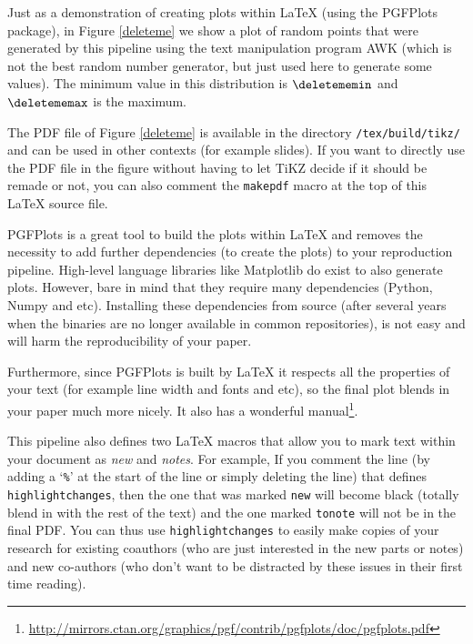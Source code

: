 \documentclass[10pt, twocolumn]{article}
\begin{document}
Just as a demonstration of creating plots within \LaTeX{} (using the
{\small PGFP}lots package), in Figure \ref{deleteme} we show a plot of
\deletemenum{} random points that were generated by this pipeline using the
text manipulation program {\small AWK} (which is not the best random number
generator, but just used here to generate some values). The minimum value
in this distribution is $\deletememin$ and $\deletememax$ is the maximum.

The {\small PDF} file of Figure \ref{deleteme} is available in the
directory \texttt{\bdir/tex/build/tikz/} and can be used in other contexts
(for example slides). If you want to directly use the {\small PDF} file in
the figure without having to let {\small T}i{\small KZ} decide if it should
be remade or not, you can also comment the \texttt{makepdf} macro at the
top of this \LaTeX{} source file.

{\small PGFP}lots is a great tool to build the plots within \LaTeX{} and
removes the necessity to add further dependencies (to create the plots) to
your reproduction pipeline. High-level language libraries like Matplotlib
do exist to also generate plots. However, bare in mind that they require
many dependencies (Python, Numpy and etc). Installing these dependencies
from source (after several years when the binaries are no longer available
in common repositories), is not easy and will harm the reproducibility of
your paper.

\begin{figure}[t]

\end{figure}

Furthermore, since {\small PGFP}lots is built by \LaTeX{} it respects all
the properties of your text (for example line width and fonts and etc), so
the final plot blends in your paper much more nicely. It also has a
wonderful
manual\footnote{\url{http://mirrors.ctan.org/graphics/pgf/contrib/pgfplots/doc/pgfplots.pdf}}.

This pipeline also defines two \LaTeX{} macros that allow you to mark text
within your document as \emph{new} and \emph{notes}. For example,   If you comment the line (by adding a `\texttt{\%}'
at the start of the line or simply deleting the line) that defines
\texttt{highlightchanges}, then the one that was marked \texttt{new} will
become black (totally blend in with the rest of the text) and the one
marked \texttt{tonote} will not be in the final PDF. You can thus use
\texttt{highlightchanges} to easily make copies of your research for
existing coauthors (who are just interested in the new parts or notes) and
new co-authors (who don't want to be distracted by these issues in their
first time reading).
\end{document}

